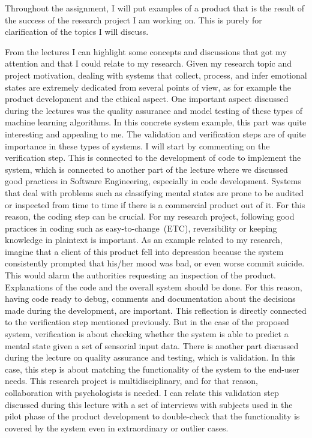 \documentclass[11pt]{article}
\begin{document}
Throughout the assignment, I will put examples of a product that is the result of the success of the research project I am working on. This is purely for clarification of the topics I will discuss.


From the lectures I can highlight some concepts and discussions that got my attention and that I could relate to my research. Given my research topic and project motivation, dealing with systems that collect, process, and infer emotional states are extremely dedicated from several points of view, as for example the product development and the ethical aspect. 
One important aspect discussed during the lectures was the quality assurance and model testing of these types of machine learning algorithms. In this concrete system example, this part was quite interesting and appealing to me. The validation and verification steps are of quite importance in these types of systems. 
I will start by commenting on the verification step. This is connected to the development of code to implement the system, which is connected to another part of the lecture where we discussed good practices in Software Engineering, especially in code development. Systems that deal with problems such as classifying mental states are prone to be audited or inspected from time to time if there is a commercial product out of it. For this reason, the coding step can be crucial. For my research project, following good practices in coding such as easy-to-change~(ETC), reversibility or keeping knowledge in plaintext is important. As an example related to my research, imagine that a client of this product fell into depression because the system consistently prompted that his/her mood was bad, or even worse commit suicide. This would alarm the authorities requesting an inspection of the product. Explanations of the code and the overall system should be done. For this reason, having code ready to debug, comments and documentation about the decisions made during the development, are important.
This reflection is directly connected to the verification step mentioned previously. But in the case of the proposed system, verification is about checking whether the system is able to predict a mental state given a set of sensorial input data. 
There is another part discussed during the lecture on quality assurance and testing, which is validation. In this case, this step is about matching the functionality of the system to the end-user needs. This research project is multidisciplinary, and for that reason, collaboration with psychologists is needed. I can relate this validation step discussed during this lecture with a set of interviews with subjects used in the pilot phase of the product development to double-check that the functionality is covered by the system even in extraordinary or outlier cases. 
\end{document}
